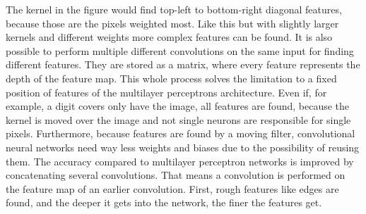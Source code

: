 The kernel in the figure would find top-left to bottom-right diagonal features, because those are the pixels weighted most.
Like this but with slightly larger kernels and different weights more complex features can be found.
It is also possible to perform multiple different convolutions on the same input for finding different features.
They are stored as a matrix, where every feature represents the depth of the feature map.
This whole process solves the limitation to a fixed position of features of the multilayer perceptrons architecture.
Even if, for example, a digit covers only have the image, all features are found, because the kernel is moved over the image and not single neurons are responsible for single pixels.
Furthermore, because features are found by a moving filter, convolutional neural networks need way less weights and biases due to the possibility of reusing them.
The accuracy compared to multilayer perceptron networks is improved by concatenating several convolutions.
That means a convolution is performed on the feature map of an earlier convolution.
First, rough features like edges are found, and the deeper it gets into the network, the finer the features get.